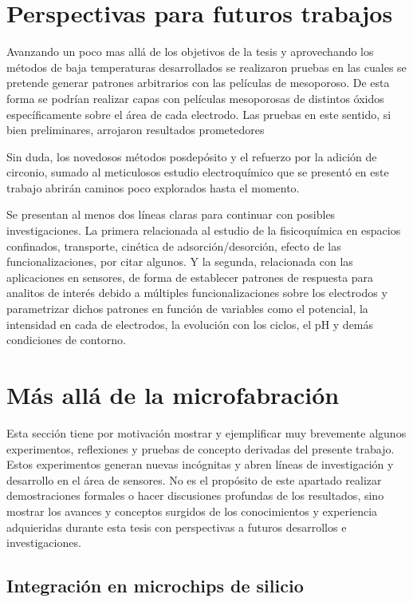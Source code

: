 \section{Perspectivas para futuros trabajos}


Avanzando un poco mas allá de los objetivos de la tesis y aprovechando los métodos de baja temperaturas desarrollados se realizaron pruebas en las cuales se pretende generar patrones arbitrarios con las películas de mesoporoso. De esta forma se podrían realizar capas con películas mesoporosas de distintos óxidos específicamente sobre el área de cada electrodo. Las pruebas en este sentido, si bien preliminares, arrojaron resultados prometedores

Sin duda, los novedosos métodos posdepósito y el refuerzo por la adición de circonio, sumado al meticulosos estudio electroquímico que se presentó en este trabajo abrirán caminos poco explorados hasta el momento.

Se presentan al menos dos líneas claras para continuar con posibles investigaciones. La primera relacionada al estudio de la fisicoquímica en espacios confinados, transporte, cinética de adsorción/desorción, efecto de las funcionalizaciones, por citar algunos. Y la segunda, relacionada con las aplicaciones en sensores, de forma de establecer patrones de respuesta para analitos de interés debido a múltiples funcionalizaciones sobre los electrodos y parametrizar dichos patrones en función de variables como el potencial, la intensidad en cada de electrodos, la evolución con los ciclos, el pH y demás condiciones de contorno.

\section{Más allá de la microfabración}
	
	  Esta sección tiene por motivación mostrar y ejemplificar muy brevemente algunos experimentos, reflexiones y pruebas de concepto derivadas del presente trabajo. Estos experimentos generan nuevas incógnitas y abren líneas de investigación y desarrollo en el área de sensores. No es el propósito de este apartado realizar demostraciones formales o hacer discusiones profundas de los resultados, sino mostrar los avances y conceptos surgidos de los conocimientos y experiencia adquieridas durante esta tesis con perspectivas a futuros desarrollos e investigaciones.

	\subsection{Integración en microchips de silicio}

